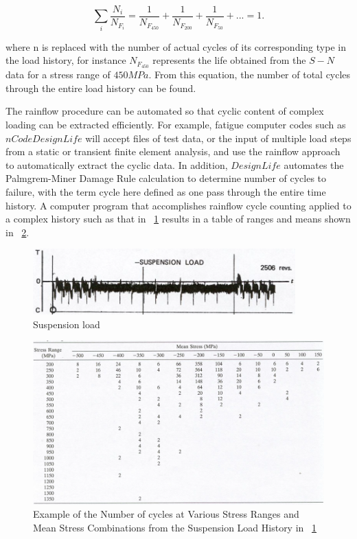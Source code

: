 \documentclass[3p,times,procedia,number]{elsarticle}
\newcommand{\figref}[1]{\figurename~\ref{#1}}
\begin{document}
$$\sum_i \frac{N_i}{N_{F_i}}=\frac{1}{N_{F_{450}}}+\frac{1}{N_{F_{200}}}+\frac{1}{N_{F_{50}}}+...=1.$$

where n is replaced with the number of actual cycles of its corresponding type in the load history, for instance $N_{F_{450}}$ represents the life obtained from the $S-N$ data for a stress range of $450MPa$.  From this equation, the number of total cycles through the entire load history can be found.

The rainflow procedure can be automated so that cyclic content of complex loading can be extracted efficiently.  For example, fatigue computer codes such as $nCode DesignLife$ will accept files of test data, or the input of multiple load steps from a static or transient finite element analysis, and use the rainflow approach to automatically extract the cyclic data.  In addition, $DesignLife$ automates the Palmgrem-Miner Damage Rule calculation to determine number of cycles to failure, with the term cycle here defined as one pass through the entire time history. A computer program that accomplishes rainflow cycle counting applied to a complex history such as that in \figref{loadhistory} results in a table of ranges and means shown in \figref{loadhistory1}.

\begin{figure}[h!]
	\centering
	\includegraphics[width=0.9\textwidth]{figures//loadhistory.png} 
	\caption{Suspension load}
	\label{loadhistory}
\end{figure}

\begin{figure}[h!]
	\centering
	\includegraphics[width=\textwidth]{figures//loadhistory1.png} 
	\caption{Example of the Number of cycles at Various Stress Ranges and Mean Stress Combinations from the Suspension Load History in \figref{loadhistory}}
	\label{loadhistory1}
\end{figure}
\end{document}
